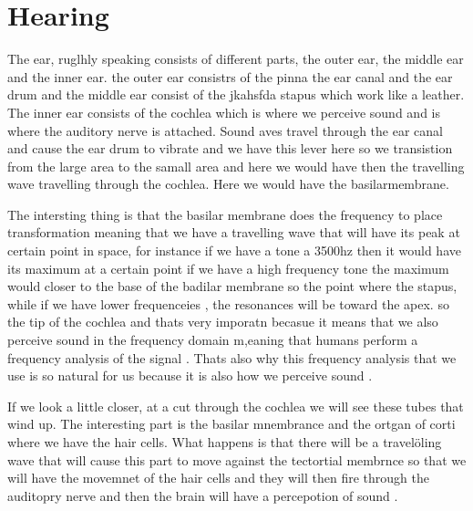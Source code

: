\clearpage
\section{Hearing}
\label{Hearing}

The ear, ruglhly speaking consists of different parts, the outer ear, the middle ear and the inner ear. the outer ear consistrs of the pinna the ear canal and the ear drum and the middle ear consist of the jkahsfda stapus which work like a leather.  The inner ear consists of the cochlea which is where we perceive sound and is where the auditory nerve is attached. Sound aves travel through the ear canal and cause the ear drum to vibrate and we have this lever here so we transistion from the large area to the samall area and here we would have then the travelling wave travelling through the cochlea. Here we would have the basilarmembrane.

The intersting thing is that the basilar membrane does the frequency to place transformation meaning that we have a travelling wave that will have its peak at certain point in space, for instance if we have a tone a 3500hz then it would have its maximum at a certain point if we have a high frequency tone the maximum would closer to the base of the badilar membrane so the point where the stapus, while if we have lower frequenceies , the resonances will be toward the apex.  so the tip of the cochlea and thats very imporatn becasue it means that we also perceive sound in the frequency domain m,eaning that humans perform a frequency analysis of the signal . Thats also why this frequency analysis that we use is so natural for us because it is also how we perceive sound .

If we look a little closer, at a cut through the cochlea we will see these tubes that wind up.  The interesting part is the basilar mnembrance and the ortgan of corti  where we have the hair cells.  What happens is that there will be a travelöling wave that will cause this part to move against the tectortial membrnce so that we will have the movemnet of the hair cells and they will then fire through the auditopry nerve and then the brain will have a percepotion of sound .

